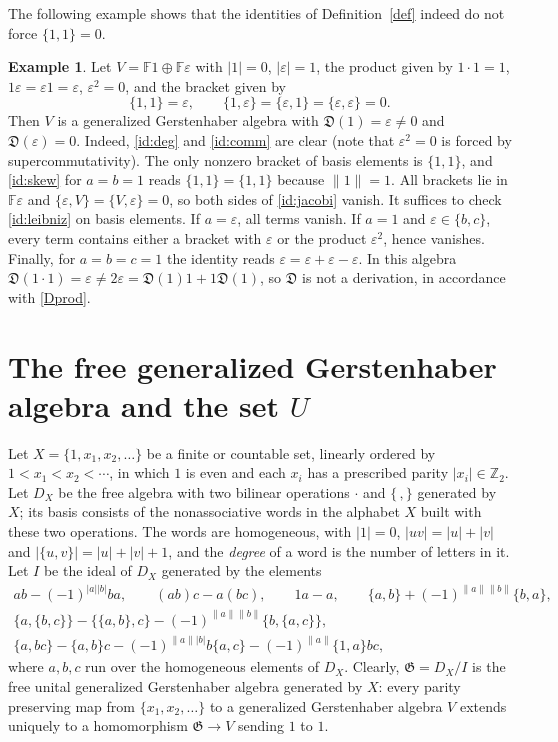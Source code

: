 \documentclass[11pt,reqno]{amsart}
\newcommand{\F}{\mathbb F}
\newcommand{\Z}{\mathbb Z}
\newcommand{\G}{\mathfrak G}
\newcommand{\D}{\mathfrak D}
\newcommand{\rp}[1]{\|#1\|}
\theoremstyle{plain}
\theoremstyle{definition}
\newtheorem{example}{Example}
\theoremstyle{remark}
\begin{document}
The following example shows that the identities of Definition~\ref{def} indeed do not force $\{1,1\}=0$.

\begin{example}\label{ex:dim2}
Let $V=\F1\oplus\F\varepsilon$ with $|1|=0$, $|\varepsilon|=1$, the product given by $1\cdot1=1$, $1\varepsilon=\varepsilon1=\varepsilon$, $\varepsilon^2=0$, and the bracket given by
$$
\{1,1\}=\varepsilon,\qquad \{1,\varepsilon\}=\{\varepsilon,1\}=\{\varepsilon,\varepsilon\}=0 .
$$
Then $V$ is a generalized Gerstenhaber algebra with $\D(1)=\varepsilon\ne0$ and $\D(\varepsilon)=0$.
Indeed, \eqref{id:deg} and \eqref{id:comm} are clear (note that $\varepsilon^2=0$ is forced by supercommutativity).
The only nonzero bracket of basis elements is $\{1,1\}$, and \eqref{id:skew} for $a=b=1$ reads $\{1,1\}=\{1,1\}$ because $\rp1=1$.
All brackets lie in $\F\varepsilon$ and $\{\varepsilon,V\}=\{V,\varepsilon\}=0$, so both sides of \eqref{id:jacobi} vanish.
It suffices to check \eqref{id:leibniz} on basis elements.
If $a=\varepsilon$, all terms vanish.
If $a=1$ and $\varepsilon\in\{b,c\}$, every term contains either a bracket with $\varepsilon$ or the product $\varepsilon^2$, hence vanishes.
Finally, for $a=b=c=1$ the identity reads $\varepsilon=\varepsilon+\varepsilon-\varepsilon$.
In this algebra $\D(1\cdot1)=\varepsilon\ne2\varepsilon=\D(1)1+1\D(1)$, so $\D$ is not a derivation, in accordance with \eqref{Dprod}.
\end{example}

\section{The free generalized Gerstenhaber algebra and the set \texorpdfstring{$U$}{U}}\label{sec:free}

Let $X=\{1,x_1,x_2,\dots\}$ be a finite or countable set, linearly ordered by $1<x_1<x_2<\cdots$, in which $1$ is even and each $x_i$ has a prescribed parity $|x_i|\in\Z_2$.
Let $D_X$ be the free algebra with two bilinear operations $\cdot$ and $\{\,,\}$ generated by $X$; its basis consists of the nonassociative words in the alphabet $X$ built with these two operations.
The words are homogeneous, with $|1|=0$, $|uv|=|u|+|v|$ and $|\{u,v\}|=|u|+|v|+1$, and the \emph{degree} of a word is the number of letters in it.
Let $I$ be the ideal of $D_X$ generated by the elements
\begin{gather*}
ab-(-1)^{|a||b|}ba,\qquad (ab)c-a(bc),\qquad 1a-a,\qquad \{a,b\}+(-1)^{\rp a\rp b}\{b,a\},\\
\{a,\{b,c\}\}-\{\{a,b\},c\}-(-1)^{\rp a\rp b}\{b,\{a,c\}\},\\
\{a,bc\}-\{a,b\}c-(-1)^{\rp a|b|}b\{a,c\}-(-1)^{\rp a}\{1,a\}bc,
\end{gather*}
where $a,b,c$ run over the homogeneous elements of $D_X$.
Clearly, $\G=D_X/I$ is the free unital generalized Gerstenhaber algebra generated by $X$: every parity preserving map from $\{x_1,x_2,\dots\}$ to a generalized Gerstenhaber algebra $V$ extends uniquely to a homomorphism $\G\to V$ sending $1$ to $1$.
\end{document}
